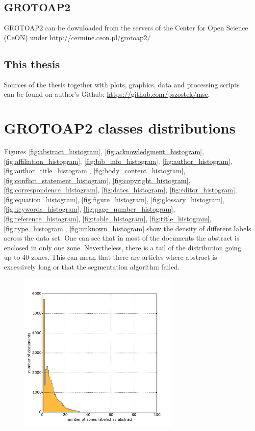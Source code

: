 \begin{appendix}
  \section{GROTOAP2}
GROTOAP2 can be downloaded from the servers of the Center for Open Science (CeON) under \url{http://cermine.ceon.pl/grotoap2/}
\section{This thesis}
Sources of the thesis together with plots, graphics, data and processing scripts can be found on author's Github: \url{https://github.com/pszostek/msc}.


\chapter{GROTOAP2 classes distributions}
\label{app:grotoap2}
Figures \ref{fig:abstract_histogram}, \ref{fig:acknowledgment_histogram}, \ref{fig:affiliation_histogram}, \ref{fig:bib_info_histogram}, \ref{fig:author_histogram}, \ref{fig:author_title_histogram}, \ref{fig:body_content_histogram}, \ref{fig:conflict_statement_histogram}, \ref{fig:copyright_histogram}, \ref{fig:correspondence_histogram}, \ref{fig:dates_histogram}, \ref{fig:editor_histogram}, \ref{fig:equation_histogram}, \ref{fig:figure_histogram}, \ref{fig:glossary_histogram}, \ref{fig:keywords_histogram}, \ref{fig:page_number_histogram}, \ref{fig:reference_histogram}, \ref{fig:table_histogram}, \ref{fig:title_histogram}, \ref{fig:type_histogram}, \ref{fig:unknown_histogram} show the density of different labels across the data set. One can see that in most of the documents the abstract is enclosed in only one zone. Nevertheless, there is a tail of the distribution going up to 40 zones. This can mean that there are articles where abstract is excessively long or that the segmentation algorithm failed. \\
\begin{figure}[b!]
\centering
\begin{minipage}[t!]{0.48\linewidth}
  \includegraphics[width=8cm]{plots/abstract_histogram}

\end{minipage}
\end{figure}
\end{appendix}
